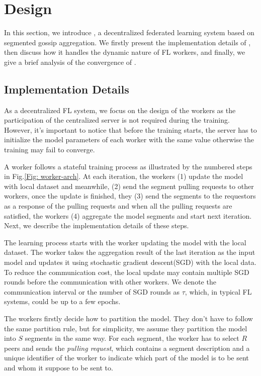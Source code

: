 
 

\section{\sys Design}
In this section, we introduce \sys, a decentralized federated learning system based on segmented gossip aggregation. We firstly present the implementation details of \sys, then discuss how it handles the dynamic nature of FL workers, and finally, we give a brief analysis of the convergence of \sys.

\subsection{Implementation Details}
As a decentralized FL system, we focus on the design of the workers as the participation of the centralized server is not required during the training. However, it's important to notice that before the training starts, the server has to initialize the model parameters of each worker with the same value otherwise the training may fail to converge. 

A \sys worker follows a stateful training process as illustrated by the numbered steps in Fig.\ref{Fig: worker-arch}. At each iteration, the workers (1) update the model with local dataset and meanwhile, (2) send the segment pulling requests to other workers, once the update is finished, they (3) send the segments to the requestors as a response of the pulling requests and when all the pulling requests are satisfied, the workers (4) aggregate the model segments and start next iteration. Next, we describe the implementation details of these steps.

 The learning process starts with the worker updating the model with the local dataset. The worker takes the aggregation result of the last iteration as the input model and updates it using stochastic gradient descent(SGD) with the local data. To reduce the communication cost, the local update may contain multiple SGD rounds before the communication with other workers. We denote the communication interval or the number of SGD rounds as $\tau$, which, in typical FL systems, could be up to a few epochs.

 The workers firstly decide how to partition the model. They don't have to follow the same partition rule, but for simplicity, we assume they partition the model into $S$ segments in the same way. For each segment, the worker has to select $R$ peers and sends the \emph{pulling request}, which contains a segment description and a unique identifier of the worker to indicate which part of the model is to be sent and whom it suppose to be sent to. 


